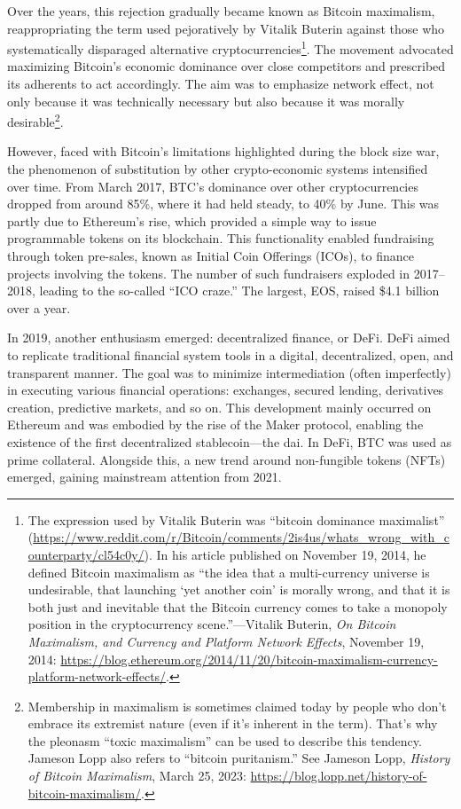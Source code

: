 \documentclass[
  a5paper,
  smalldemyvopaper,10pt,twoside,onecolumn,openright,extrafontsizes,hidelinks]{memoir}
\newlength\drop
\begin{document}
Over the years, this rejection gradually became known as Bitcoin
maximalism, reappropriating the term used pejoratively by Vitalik
Buterin against those who systematically disparaged alternative
cryptocurrencies\footnote{The expression used by Vitalik Buterin was
  ``bitcoin dominance maximalist''
  (\url{https://www.reddit.com/r/Bitcoin/comments/2is4us/whats_wrong_with_counterparty/cl54c0y/}).
  In his article published on November 19, 2014, he defined Bitcoin
  maximalism as ``the idea that a multi-currency universe is
  undesirable, that launching `yet another coin' is morally wrong, and
  that it is both just and inevitable that the Bitcoin currency comes to
  take a monopoly position in the cryptocurrency scene.''---Vitalik
  Buterin, \emph{On Bitcoin Maximalism, and Currency and Platform
  Network Effects}, November 19, 2014:
  \url{https://blog.ethereum.org/2014/11/20/bitcoin-maximalism-currency-platform-network-effects/}.}.
The movement advocated maximizing Bitcoin's economic dominance over
close competitors and prescribed its adherents to act accordingly. The
aim was to emphasize network effect, not only because it was technically
necessary but also because it was morally desirable\footnote{Membership
  in maximalism is sometimes claimed today by people who don't embrace
  its extremist nature (even if it's inherent in the term). That's why
  the pleonasm ``toxic maximalism'' can be used to describe this
  tendency. Jameson Lopp also refers to ``bitcoin puritanism.'' See
  Jameson Lopp, \emph{History of Bitcoin Maximalism}, March 25, 2023:
  \url{https://blog.lopp.net/history-of-bitcoin-maximalism/}.}.

However, faced with Bitcoin's limitations highlighted during the block
size war, the phenomenon of substitution by other crypto-economic
systems intensified over time. From March 2017, BTC's dominance over
other cryptocurrencies dropped from around 85\%, where it had held
steady, to 40\% by June. This was partly due to Ethereum's rise, which
provided a simple way to issue programmable tokens on its blockchain.
This functionality enabled fundraising through token pre-sales, known as
Initial Coin Offerings (ICOs), to finance projects involving the tokens.
The number of such fundraisers exploded in 2017--2018, leading to the
so-called ``ICO craze.'' The largest, EOS, raised \$4.1 billion over a
year.

In 2019, another enthusiasm emerged: decentralized finance, or DeFi.
DeFi aimed to replicate traditional financial system tools in a digital,
decentralized, open, and transparent manner. The goal was to minimize
intermediation (often imperfectly) in executing various financial
operations: exchanges, secured lending, derivatives creation, predictive
markets, and so on. This development mainly occurred on Ethereum and was
embodied by the rise of the Maker protocol, enabling the existence of
the first decentralized stablecoin---the dai. In DeFi, BTC was used as
prime collateral. Alongside this, a new trend around non-fungible tokens
(NFTs) emerged, gaining mainstream attention from 2021.
\end{document}

